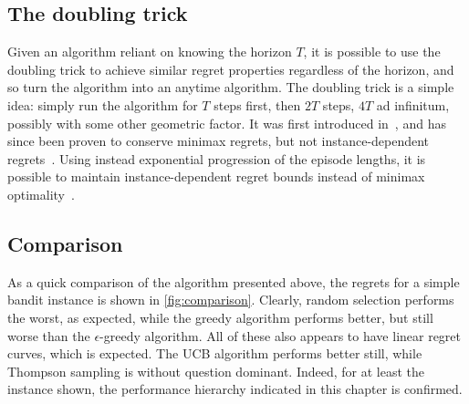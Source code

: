 \subsection{The doubling trick}
Given an algorithm reliant on knowing the horizon $T$, it is possible to use the doubling trick to achieve similar regret properties regardless of the horizon, and so turn the algorithm into an anytime algorithm.
The doubling trick is a simple idea: simply run the algorithm for $T$ steps first, then $2T$ steps, $4T$ ad infinitum, possibly with some other geometric factor.
It was first introduced in~\autocite{auer1995}, and has since been proven to conserve minimax regrets, but not instance-dependent regrets~\autocite{besson2018}.
Using instead exponential progression of the episode lengths, it is possible to maintain instance-dependent regret bounds instead of minimax optimality~\autocite{besson2018}.

\subsection{Comparison}
\label{sec:comparison}
As a quick comparison of the algorithm presented above, the regrets for a simple bandit instance is shown in \cref{fig:comparison}.
Clearly, random selection performs the worst, as expected, while the greedy algorithm performs better, but still worse than the $\epsilon$-greedy algorithm.
All of these also appears to have linear regret curves, which is expected.
The UCB algorithm performs better still, while Thompson sampling is without question dominant.
Indeed, for at least the instance shown, the performance hierarchy indicated in this chapter is confirmed.

